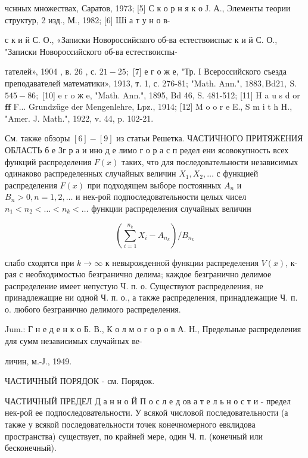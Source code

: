 \documentclass[10pt]{article}
\begin{document}
чснных множествах, Саратов, 1973; [5] С к о р н я к о Ј. А., Элементы теории структур, 2 изд., М., 1982; [6] Ші а т у н о в-

с к и й С. О., «Записки Новороссийского об-ва естествоиспыс к и й С. О., "Записки Новороссийского об-ва естествоиспы-

тателей», 1904 , в. 26 , с. $21-25 ;$ [7] е г о ж е, "Тр. І Всероссийского съезда преподавателей математики», 1913, т. 1, с. 276-81; "Math. Ann.", $1883, \mathrm{Bd} 21, \mathrm{~S}$. $545-86 ;$ [10] e r o ж e, "Math. Ann.", 1895, Bd 46, S. 481-512; [11] H a u s d or $\mathbf{f} \mathbf{f}$ F... Grundzüge der Mengenlehre, Lpz., 1914; [12] M o o r e E., S $\mathrm{m}$ i t h H., "Amer. J. Math.", 1922, v. 44, p. 102-21.



См. также обзоры $[6]-[9]$ из статьи Решетка. ЧАСТИЧНОГО ПРИТЯЖЕНИЯ ОБЛАСТЬ б е Зг р а и ино д е лимо г о р а с п редел ени ясовокупность всех функций распределения $F(x)$ таких, что для последовательности независимых одинаково распределенных случайных величин $X_{1}, X_{2}, \ldots$ с функцией распределения $F(x)$ при подходящем выборе постоянных $A_{n}$ и $B_{n}>0, n=1,2, \ldots$ и нек-рой подпоследовательности целых чисел $n_{1}<n_{2}<\ldots<n_{k}<\ldots$ функции распределения случайных величин



\[

\left(\sum_{i=1}^{n_{k}} X_{i}-A_{n_{k}}\right) / B_{n_{k}}

\]



слабо сходятся при $k \rightarrow \infty$ к невырожденной функции распределения $V(x)$, к-рая с необходимостью безгранично делима; каждое безгранично делимое распределение имеет непустую Ч. п. о. Существуют распределения, не принадлежащие ни одной Ч. п. о., а также распределения, принадлежащие Ч. п. о. любого безгранично делимого распределения.



Jum.: Г н е д е н к о Б. В., К о л м о г о р о в А. Н., Предельные распределения для сумм независимых случайных ве-

личин, м.-Ј., 1949.



ЧАСТИЧНЫЙ ПОРЯДОК - см. Порядок.



ЧАСТИЧНЫЙ ПРЕДЕЛ Д а н н о Й П о с л е д ов а т е л ь н о с т и - предел нек-рой ее подпоследовательности. У всякой числовой последовательности (а также у всякой последовательности точек конечномерного евклидова пространства) существует, по крайней мере, один Ч. п. (конечный или бесконечный).
\end{document}
